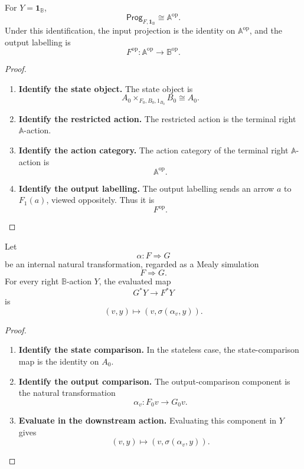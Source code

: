\begin{corollary}
\label{cor:relative-terminal-stateless}
For \(Y=\mathbf 1_{\mathbb B}\),
\[
\mathsf{Prog}_{F,\mathbf 1_{\mathbb B}}
\cong
\mathbb A^{\mathrm{op}}.
\]
Under this identification, the input projection is the identity on
\(\mathbb A^{\mathrm{op}}\), and the output labelling is
\[
F^{\mathrm{op}}:\mathbb A^{\mathrm{op}}\to\mathbb B^{\mathrm{op}}.
\]
\end{corollary}

\begin{proof}
\leavevmode
\begin{enumerate}
\item \textbf{Identify the state object.}
The state object is
\[
A_0\times_{F_0,B_0,1_{B_0}}B_0\cong A_0.
\]

\item \textbf{Identify the restricted action.}
The restricted action is the terminal right \(\mathbb A\)-action.

\item \textbf{Identify the action category.}
The action category of the terminal right \(\mathbb A\)-action is
\[
\mathbb A^{\mathrm{op}}.
\]

\item \textbf{Identify the output labelling.}
The output labelling sends an arrow \(a\) to \(F_1(a)\), viewed oppositely.
Thus it is
\[
F^{\mathrm{op}}.
\]
\end{enumerate}
\end{proof}

\begin{proposition}
\label{prop:relative-stateless-natural-transformations}
Let
\[
\alpha:F\Rightarrow G
\]
be an internal natural transformation, regarded as a Mealy simulation
\[
F\Rightarrow G.
\]
For every right \(\mathbb B\)-action \(Y\), the evaluated map
\[
G^\ast Y\to F^\ast Y
\]
is
\[
(v,y)\longmapsto
(v,\sigma(\alpha_v,y)).
\]
\end{proposition}

\begin{proof}
\leavevmode
\begin{enumerate}
\item \textbf{Identify the state comparison.}
In the stateless case, the state-comparison map is the identity on \(A_0\).

\item \textbf{Identify the output comparison.}
The output-comparison component is the natural transformation
\[
\alpha_v:F_0v\to G_0v.
\]

\item \textbf{Evaluate in the downstream action.}
Evaluating this component in \(Y\) gives
\[
(v,y)\longmapsto
(v,\sigma(\alpha_v,y)).
\]
\end{enumerate}
\end{proof}

